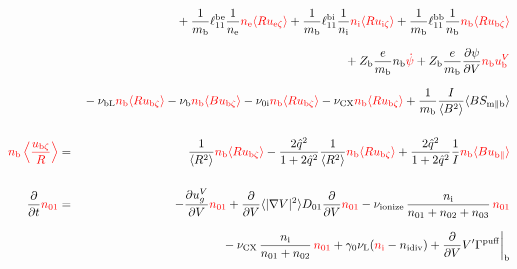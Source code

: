 \documentclass[11pt]{article}
\def\r#1{{\rm#1}}
\def\ave#1{\left\langle#1\right\rangle}
\def\aves#1{\langle#1\rangle}
\def\dd#1#2{\frac{\partial #1}{\partial #2}}
\def\para{\parallel}
\def\ddV{\frac{\partial}{\partial V}}
\def\mi{m_\r{i}}
\def\mb{m_\r{b}}
\def\nee{n_\r{e}}
\def\ni{n_\r{i}}
\def\nb{n_\r{b}}
\def\nna{n_{01}}
\def\nnb{n_{02}}
\def\nnc{n_{03}}
\def\Te{T_\r{e}}
\def\Zi{Z_\r{i}}
\def\Zb{Z_\r{b}}
\def\uezt{u_{\r{e}\zeta}}
\def\uizt{u_{\r{i}\zeta}}
\def\ubzt{u_{\r{b}\zeta}}
\def\uepara{u_{\r{e}\para}}
\def\ubpara{u_{\r{b}\para}}
\def\qhatepara{\hat{q}_{\r{e}\para}}
\def\qhatipara{\hat{q}_{\r{i}\para}}
\def\ubV{u_\r{b}^V}
\def\ugV{u_{g}^V}
\def\bri{\aves{B^2}\aves{R^2} - I^2}
\def\ddt{\frac{\partial}{\partial t}}
\def\De{D_\r{e}}
\def\nuni{\nu_\r{0i}}
\def\nuL{\nu_\r{L}}
\def\nuCX{\nu_\r{CX}}
\def\nuion{\nu_\r{ionize}}
\def\nub{\nu_\r{b}}
\def\nidiv{n_\r{idiv}}
\def\nuOL{\nu_\r{OL}}
\def\nubL{\nu_\r{bL}}
\def\red#1{\textcolor{red}{#1}}
\begin{document}
\begin{eqnarray}
\nonumber\\[2.5mm]&&{}
%
  + \frac{1}{\mb} \ell_{11}^\r{be} \frac{1}{\nee} \red{\nee \aves{R \uezt}}
  + \frac{1}{\mb} \ell_{11}^\r{bi} \frac{1}{\ni} \red{\ni \aves{R \uizt}}
  + \frac{1}{\mb} \ell_{11}^\r{bb} \frac{1}{\nb} \red{\nb \aves{R \ubzt}}
\nonumber\\[2.5mm]&&{}
%
%
  + \Zb \frac{e}{\mb}              \nb \red{\dot{\psi}}
%
  + \Zb \frac{e}{\mb} \dd{\psi}{V} \red{\nb \ubV}
%
\nonumber\\[2.5mm]&&{}
%
  - \nubL  \red{\nb \aves{R \ubzt}}
%
  - \nub  \red{\nb \aves{B \ubzt}}
%
  - \nuni \red{\nb \aves{R \ubzt}}
%
  - \nuCX \red{\nb \aves{R \ubzt}}
%
%
  + \frac{1}{\mb} \frac{I}{\aves{B^2}} \aves{B S_{\r{m}\para\r{b}}}
%
\\[5mm]
    \red{\nb \ave{\frac{\ubzt}{R}}} &=&
%
    \frac{1}{\aves{R^2}} \red{\nb \aves{R\ubzt}}
%
  - \frac{2\hat{q}^2}{1+2\hat{q}^2} \frac{1}{\aves{R^2}}\red{\nb\aves{R\ubzt}}
%
  + \frac{2\hat{q}^2}{1+2\hat{q}^2} \frac{1}{I}\red{\nb \aves{B\ubpara}}
\\[5mm]
  \ddt \red{\nna} &=& 
%
  - \dd{\ugV}{V} \red{\nna}
%
  + \ddV \aves{|\nabla V|^2} D_{01} \ddV \red{\nna}
%
  - \nuion\, \frac{\ni}{\nna + \nnb + \nnc}\, \red{\nna}
%
\nonumber\\[2.5mm]&&{}
  - \nuCX\, \frac{\ni}{\nna + \nnb}\, \red{\nna}
%
  + \gamma_0 \nuL (\red{\ni} - \nidiv)
%
  + \ddV V' \Gamma^\r{puff}\biggr|_\r{b}
\\[5mm]

\end{eqnarray}
\end{document}

